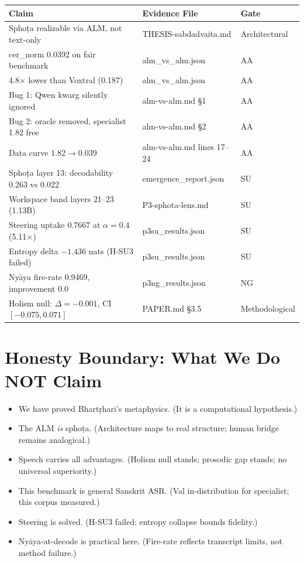 \documentclass[11pt]{article}
\begin{document}
\small
\begin{tabular}{p{4cm}p{2.5cm}p{1.8cm}}
\toprule
\textbf{Claim} & \textbf{Evidence File} & \textbf{Gate} \\
\midrule
Sphoṭa realizable via ALM, not text-only & THESIS-sabdadvaita.md & Architectural \\
cer\_norm 0.0392 on fair benchmark & alm\_vs\_alm.json & AA \\
4.8$\times$ lower than Voxtral (0.187) & alm\_vs\_alm.json & AA \\
Bug 1: Qwen kwarg silently ignored & alm-vs-alm.md \S1 & AA \\
Bug 2: oracle removed, specialist 1.82 free & alm-vs-alm.md \S2 & AA \\
Data curve 1.82$\to$0.039 & alm-vs-alm.md lines 17--24 & AA \\
Sphoṭa layer 13: decodability 0.263 vs 0.022 & emergence\_report.json & SU \\
Workspace band layers 21--23 (1.13B) & P3-sphota-lens.md & SU \\
Steering uptake 0.7667 at $\alpha=0.4$ (5.11$\times$) & p3su\_results.json & SU \\
Entropy delta $-1.436$ nats (H-SU3 failed) & p3su\_results.json & SU \\
Nyāya fire-rate 0.9469, improvement 0.0 & p3ng\_results.json & NG \\
Holism null: $\Delta=-0.001$, CI $[-0.075, 0.071]$ & PAPER.md \S3.5 & Methodological \\
\bottomrule
\end{tabular}
\normalsize

\section{Honesty Boundary: What We Do NOT Claim}

\begin{itemize}
\item We have proved Bhartṛhari's metaphysics. (It is a computational hypothesis.)
\item The ALM \emph{is} sphoṭa. (Architecture maps to real structure; human bridge remains analogical.)
\item Speech carries all advantages. (Holism null stands; prosodic gap stands; no universal superiority.)
\item This benchmark is general Sanskrit ASR. (Val in-distribution for specialist; this corpus measured.)
\item Steering is solved. (H-SU3 failed: entropy collapse bounds fidelity.)
\item Nyāya-at-decode is practical here. (Fire-rate reflects transcript limits, not method failure.)
\end{itemize}
\end{document}
